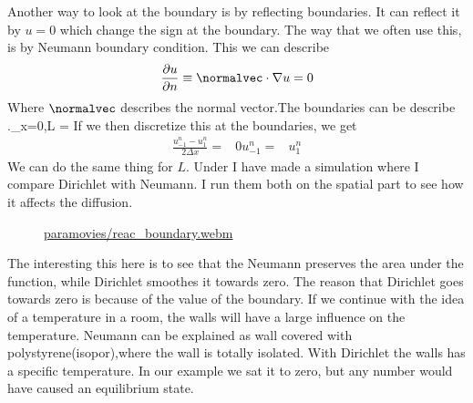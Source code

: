 \documentclass{article}
\begin{document}
Another way to look at the boundary is by reflecting boundaries. It can reflect it by $u=0$ which change the sign at the boundary. The way that we often use this, is by Neumann boundary condition. This we can describe
\begin{equation}
 \frac{\partial u}{\partial n} \equiv \normalvec\cdot\nabla u = 0
\end{equation}
Where $\normalvec$ describes the normal vector.The boundaries can be describe  
\left.\right\vert_{x=0,L} =
If we then discretize this at the boundaries, we get
\begin{align*}
\frac{u_{-1}^n - u_1^n}{2\Delta x} =& 0
u_{-1}^n =& u_1^n
\end{align*}
We can do the same thing for $L$.
Under I have made a simulation where I compare Dirichlet with Neumann. I run them
both on the spatial part to see how it affects the diffusion.


\begin{figure}[ht]
\begin{center}

\href{run:paramovies/reac_boundary.webm}{paramovies/reac_boundary.webm}

\end{center}
\caption{}
\end{figure}


The interesting this here is to see that the Neumann preserves the area under the function, while Dirichlet smoothes it towards zero. The reason that Dirichlet goes towards zero is because of the value of the boundary. If we continue with the idea of a temperature in a room, the walls will have a large influence on the temperature. Neumann can be explained as wall covered with polystyrene(isopor),where the wall is totally isolated. With Dirichlet the walls has a specific temperature. In our example we sat it to zero, but any number would have caused an equilibrium state.  
\end{document}
